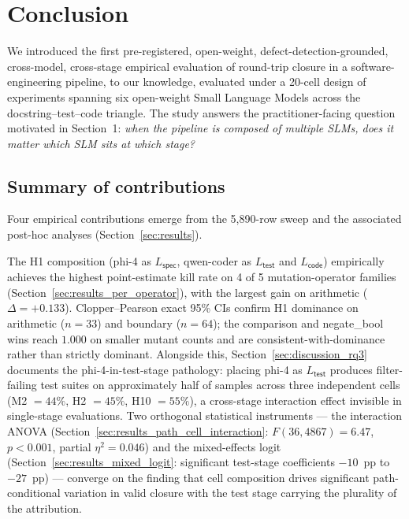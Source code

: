 \section{Conclusion}
\label{sec:conclusion}

We introduced the first pre-registered, open-weight, defect-detection-grounded, cross-model, cross-stage empirical evaluation of round-trip closure in a software-engineering pipeline, to our knowledge, evaluated under a 20-cell design of experiments spanning six open-weight Small Language Models across the docstring--test--code triangle. The study answers the practitioner-facing question motivated in Section~1: \emph{when the pipeline is composed of multiple SLMs, does it matter which SLM sits at which stage?}

\subsection{Summary of contributions}

Four empirical contributions emerge from the 5{,}890-row sweep and the associated post-hoc analyses (Section~\ref{sec:results}).

The H1 composition (phi-4 as $L_{\textsf{spec}}$, qwen-coder as $L_{\textsf{test}}$ and $L_{\textsf{code}}$) empirically achieves the highest point-estimate kill rate on 4 of 5 mutation-operator families (Section~\ref{sec:results_per_operator}), with the largest gain on arithmetic ($\Delta = +0.133$). Clopper--Pearson exact 95\% CIs confirm H1 dominance on arithmetic ($n = 33$) and boundary ($n = 64$); the comparison and negate\_bool wins reach $1.000$ on smaller mutant counts and are consistent-with-dominance rather than strictly dominant. Alongside this, Section~\ref{sec:discussion_rq3} documents the phi-4-in-test-stage pathology: placing phi-4 as $L_{\textsf{test}}$ produces filter-failing test suites on approximately half of samples across three independent cells (M2 $= 44\%$, H2 $= 45\%$, H10 $= 55\%$), a cross-stage interaction effect invisible in single-stage evaluations. Two orthogonal statistical instruments --- the interaction ANOVA (Section~\ref{sec:results_path_cell_interaction}: $F(36, 4867) = 6.47$, $p < 0.001$, partial $\eta^2 = 0.046$) and the mixed-effects logit (Section~\ref{sec:results_mixed_logit}: significant test-stage coefficients $-10$~pp to $-27$~pp) --- converge on the finding that cell composition drives significant path-conditional variation in valid closure with the test stage carrying the plurality of the attribution.


